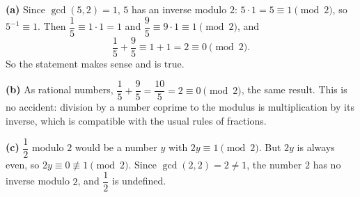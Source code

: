 \textbf{(a)} Since $\gcd(5,2)=1$, $5$ has an inverse modulo $2$: $5\cdot1=5\equiv1\pmod2$, so $5^{-1}\equiv1$. Then $\dfrac15\equiv1\cdot1=1$ and $\dfrac95\equiv9\cdot1\equiv1\pmod2$, and
\[\dfrac15+\dfrac95\equiv1+1=2\equiv0\pmod2.\]
So the statement makes sense and is $\boxed{\text{true}}$.

\textbf{(b)} As rational numbers, $\dfrac15+\dfrac95=\dfrac{10}{5}=2\equiv0\pmod2$, the same result. This is no accident: division by a number coprime to the modulus is multiplication by its inverse, which is compatible with the usual rules of fractions.

\textbf{(c)} $\dfrac12$ modulo $2$ would be a number $y$ with $2y\equiv1\pmod2$. But $2y$ is always even, so $2y\equiv0\not\equiv1\pmod2$. Since $\gcd(2,2)=2\ne1$, the number $2$ has no inverse modulo $2$, and $\dfrac12$ is undefined.

